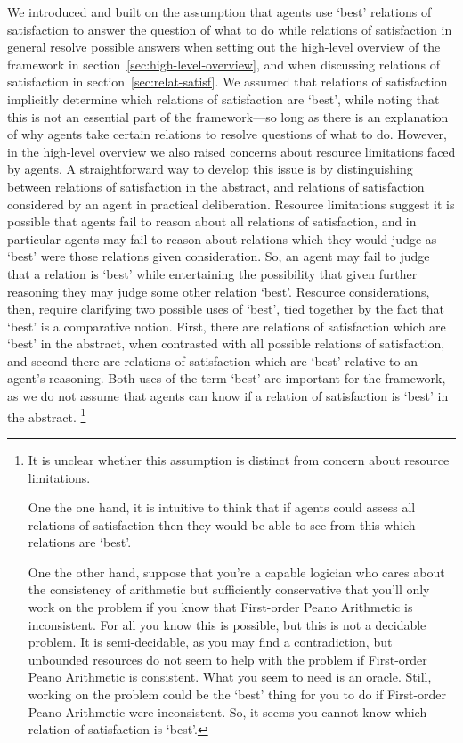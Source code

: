 \documentclass[10pt]{article}
\begin{document}
We introduced and built on the assumption that agents use `best' relations of satisfaction to answer the question of what to do while relations of satisfaction in general resolve possible answers when setting out the high-level overview of the framework in section~\ref{sec:high-level-overview}, and when discussing relations of satisfaction in section~\ref{sec:relat-satisf}.
We assumed that relations of satisfaction implicitly determine which relations of satisfaction are `best', while noting that this is not an essential part of the framework---so long as there is an explanation of why agents take certain relations to resolve questions of what to do.
However, in the high-level overview we also raised concerns about resource limitations faced by agents.
A straightforward way to develop this issue is by distinguishing between relations of satisfaction in the abstract, and relations of satisfaction considered by an agent in practical deliberation.
Resource limitations suggest it is possible that agents fail to reason about all relations of satisfaction, and in particular agents may fail to reason about relations which they would judge as `best' were those relations given consideration.
So, an agent may fail to judge that a relation is `best' while entertaining the possibility that given further reasoning they may judge some other relation `best'.
Resource considerations, then, require clarifying two possible uses of `best', tied together by the fact that `best' is a comparative notion.
First, there are relations of satisfaction which are `best' in the abstract, when contrasted with all possible relations of satisfaction, and second there are relations of satisfaction which are `best' relative to an agent's reasoning.
Both uses of the term `best' are important for the framework, as we do not assume that agents can know if a relation of satisfaction is `best' in the abstract.\nolinebreak
\footnote{It is unclear whether this assumption is distinct from concern about resource limitations.

  One the one hand, it is intuitive to think that if agents could assess all relations of satisfaction then they would be able to see from this which relations are `best'.

  One the other hand, suppose that you're a capable logician who cares about the consistency of arithmetic but sufficiently conservative that you'll only work on the problem if you know that First-order Peano Arithmetic is inconsistent.
  For all you know this is possible, but this is not a decidable problem.
  It is semi-decidable, as you may find a contradiction, but unbounded resources do not seem to help with the problem if First-order Peano Arithmetic is consistent.
  What you seem to need is an oracle.
  Still, working on the problem could be the `best' thing for you to do if First-order Peano Arithmetic were inconsistent.
  So, it seems you cannot know which relation of satisfaction is `best'.}
\end{document}
